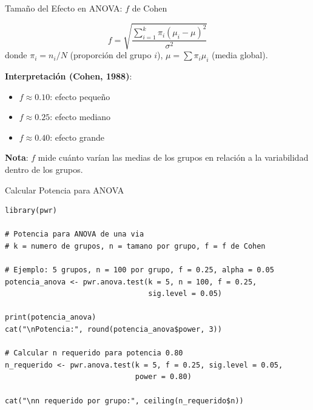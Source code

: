\documentclass[aspectratio=169, 11pt]{beamer}
\begin{document}
\begin{frame}{Tamaño del Efecto en ANOVA: $f$ de Cohen}
\begin{definition}[f de Cohen]
\[
f = \sqrt{\frac{\sum_{i=1}^k \pi_i (\mu_i - \mu)^2}{\sigma^2}}
\]
donde $\pi_i = n_i / N$ (proporción del grupo $i$), $\mu = \sum \pi_i \mu_i$ (media global).
\end{definition}

\vspace{0.3cm}
\textbf{Interpretación (Cohen, 1988)}:
\begin{itemize}
  \item $f \approx 0.10$: efecto \alert{pequeño}
  \item $f \approx 0.25$: efecto \alert{mediano}
  \item $f \approx 0.40$: efecto \alert{grande}
\end{itemize}

\vspace{0.3cm}
\textbf{Nota}: $f$ mide cuánto varían las medias de los grupos en relación a la variabilidad dentro de los grupos.
\end{frame}

\begin{frame}[fragile]{Calcular Potencia para ANOVA}
\begin{lstlisting}[basicstyle=\ttfamily\scriptsize]
library(pwr)

# Potencia para ANOVA de una via
# k = numero de grupos, n = tamano por grupo, f = f de Cohen

# Ejemplo: 5 grupos, n = 100 por grupo, f = 0.25, alpha = 0.05
potencia_anova <- pwr.anova.test(k = 5, n = 100, f = 0.25,
                                 sig.level = 0.05)

print(potencia_anova)
cat("\nPotencia:", round(potencia_anova$power, 3))

# Calcular n requerido para potencia 0.80
n_requerido <- pwr.anova.test(k = 5, f = 0.25, sig.level = 0.05,
                              power = 0.80)

cat("\nn requerido por grupo:", ceiling(n_requerido$n))
\end{lstlisting}
\end{frame}
\end{document}
